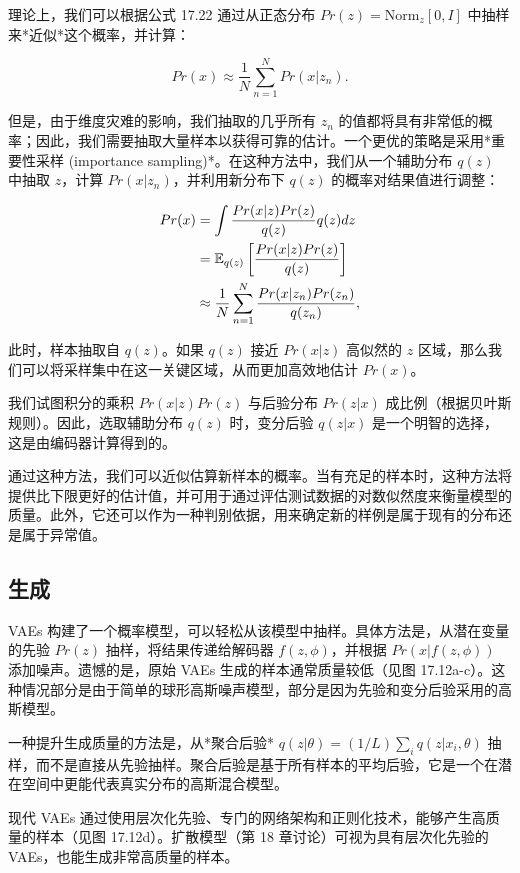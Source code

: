 \documentclass[lang=cn,newtx,10pt,scheme=chinese]{elegantbook}
\begin{document}
理论上，我们可以根据公式 17.22 通过从正态分布 \(Pr(z) = \text{Norm}_z[0,I]\) 中抽样来*近似*这个概率，并计算：

\begin{equation}
Pr(x) \approx \frac{1}{N} \sum_{n=1}^{N} Pr(x|z_n). 
\end{equation}

但是，由于维度灾难的影响，我们抽取的几乎所有 \(z_n\) 的值都将具有非常低的概率；因此，我们需要抽取大量样本以获得可靠的估计。一个更优的策略是采用*重要性采样 (importance sampling)*。在这种方法中，我们从一个辅助分布 \(q(z)\) 中抽取 \(z\)，计算 \(Pr(x|z_n)\)，并利用新分布下 \(q(z)\) 的概率对结果值进行调整：


\begin{align}
Pr(x) &= \int \frac{Pr(x|z)Pr(z)}{q(z)}q(z)dz \notag \\
&= \mathbb{E}_{q(z)} \left[\frac{Pr(x|z)Pr(z)}{q(z)}\right] \notag \\
&\approx \frac{1}{N} \sum_{n=1}^{N} \frac{Pr(x|z_n)Pr(z_n)}{q(z_n)}, 
\end{align} 


此时，样本抽取自 \(q(z)\)。如果 \(q(z)\) 接近 \(Pr(x|z)\) 高似然的 \(z\) 区域，那么我们可以将采样集中在这一关键区域，从而更加高效地估计 \(Pr(x)\)。

我们试图积分的乘积 \(Pr(x|z)Pr(z)\) 与后验分布 \(Pr(z|x)\) 成比例（根据贝叶斯规则）。因此，选取辅助分布 \(q(z)\) 时，变分后验 \(q(z|x)\) 是一个明智的选择，这是由编码器计算得到的。

通过这种方法，我们可以近似估算新样本的概率。当有充足的样本时，这种方法将提供比下限更好的估计值，并可用于通过评估测试数据的对数似然度来衡量模型的质量。此外，它还可以作为一种判别依据，用来确定新的样例是属于现有的分布还是属于异常值。

\subsection{生成}
VAEs 构建了一个概率模型，可以轻松从该模型中抽样。具体方法是，从潜在变量的先验 \(Pr(z)\) 抽样，将结果传递给解码器 \(f(z, \phi)\)，并根据 \(Pr(x|f(z, \phi))\) 添加噪声。遗憾的是，原始 VAEs 生成的样本通常质量较低（见图 17.12a-c）。这种情况部分是由于简单的球形高斯噪声模型，部分是因为先验和变分后验采用的高斯模型。

一种提升生成质量的方法是，从*聚合后验* \(q(z|\theta) = (1/L) \sum_{i} q(z|x_i, \theta)\) 抽样，而不是直接从先验抽样。聚合后验是基于所有样本的平均后验，它是一个在潜在空间中更能代表真实分布的高斯混合模型。

现代 VAEs 通过使用层次化先验、专门的网络架构和正则化技术，能够产生高质量的样本（见图 17.12d）。扩散模型（第 18 章讨论）可视为具有层次化先验的 VAEs，也能生成非常高质量的样本。
\end{document}
